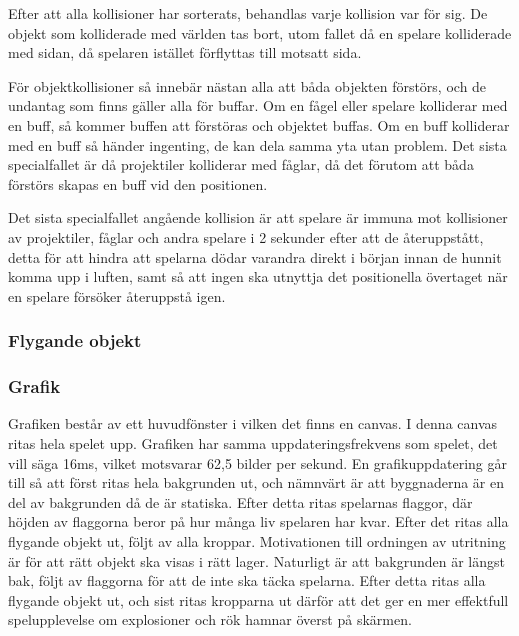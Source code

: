 \documentclass[12pt,a4paper]{article}
\begin{document}
\vspace{0.2cm}

Efter att alla kollisioner har sorterats, behandlas varje kollision var för sig. De objekt som kolliderade med världen tas bort, utom fallet då en spelare kolliderade med sidan, då spelaren istället förflyttas till motsatt sida.

För objektkollisioner så innebär nästan alla att båda objekten förstörs, och de undantag som finns gäller alla för buffar. Om en fågel eller spelare kolliderar med en buff, så kommer buffen att förstöras och objektet buffas. Om en buff kolliderar med en buff så händer ingenting, de kan dela samma yta utan problem. Det sista specialfallet är då projektiler kolliderar med fåglar, då det förutom att båda förstörs skapas en buff vid den positionen.

\vspace{0.2cm}

Det sista specialfallet angående kollision är att spelare är immuna mot kollisioner av projektiler, fåglar och andra spelare i 2 sekunder efter att de återuppstått, detta för att hindra att spelarna dödar varandra direkt i början innan de hunnit komma upp i luften, samt så att ingen ska utnyttja det positionella övertaget när en spelare försöker återuppstå igen.

\subsubsection{Flygande objekt}



\subsubsection{Grafik}
Grafiken består av ett huvudfönster i vilken det finns en canvas. I denna canvas ritas hela spelet upp. Grafiken har samma uppdateringsfrekvens som spelet, det vill säga 16ms, vilket motsvarar 62,5 bilder per sekund. En grafikuppdatering går till så att först ritas hela bakgrunden ut, och nämnvärt är att byggnaderna är en del av bakgrunden då de är statiska. Efter detta ritas spelarnas flaggor, där höjden av flaggorna beror på hur många liv spelaren har kvar. Efter det ritas alla flygande objekt ut, följt av alla kroppar. Motivationen till ordningen av utritning är för att rätt objekt ska visas i rätt lager. Naturligt är att bakgrunden är längst bak, följt av flaggorna för att de inte ska täcka spelarna. Efter detta ritas alla flygande objekt ut, och sist ritas kropparna ut därför att det ger en mer effektfull spelupplevelse om explosioner och rök hamnar överst på skärmen.
\end{document}
